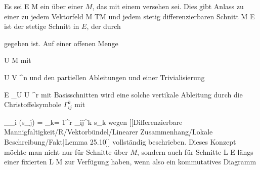 \setcounter{section}{27}


Es sei
 { E } { M
} {}
ein
über einer
$M$, das mit einem
versehen sei. Dies gibt Anlass zu einer
zu jedem Vektorfeld
 { M } { TM
} {}
und jedem stetig differenzierbaren Schnitt
 { M } { E
} {}
ist
 der stetige Schnitt in $E$, der durch

 {  }

gegeben ist. Auf einer offenen Menge

\mavergleichskette
{\vergleichskette
{ U
}
{ \subseteq }{ M
}
{  }{
}
{    }{
}
{   }{
}
}
{}{}{}
mit

\mavergleichskette
{\vergleichskette
{ U
}
{ \cong }{ V
}
{ \subseteq }{ \R^n
}
{    }{
}
{   }{
}
}
{}{}{}
und den partiellen Ableitungen
 und einer Trivialisierung

\mavergleichskettedisp
{\vergleichskette
{ E \vert_U
}
{ \cong} { U \times \R^r
}
{ } {
}
{ } {
}
{ } {
}
}
{}{}{}
mit Basisschnitten
 wird eine solche vertikale Ableitung durch die Christoffelsymbole $\Gamma_{ij}^k$ mit

\mavergleichskettedisp
{\vergleichskette
{ \nabla_{\partial_i } (s_j)
}
{ =} { \sum_{k= 1}^r  \Gamma_{ij}^k s_k
}
{ } {
}
{ } {
}
{ } {
}
}
{}{}{}
wegen
[[Differenzierbare Mannigfaltigkeit/R/Vektorbündel/Linearer Zusammenhang/Lokale Beschreibung/Fakt|Lemma 25.10]]
vollständig beschrieben. Dieses Konzept möchte man nicht nur für Schnitte über $M$, sondern auch für Schnitte
 { L } { E
} {}
längs einer fixierten
\maabbdisp {\psi} { L } { M
} {}
zur Verfügung haben, wenn also ein kommutatives Diagramm

 {  }

